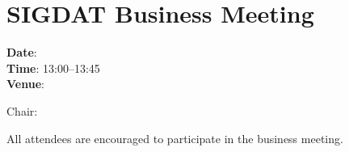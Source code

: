 \section[SIGDAT Business Meeting]{SIGDAT Business Meeting}

\textbf{Date}: \daydateyear \\
\textbf{Time}: 13:00--13:45 \\
\textbf{Venue}: \BusinessMeetingLoc

Chair: 

All attendees are encouraged to participate in the business
meeting. 
